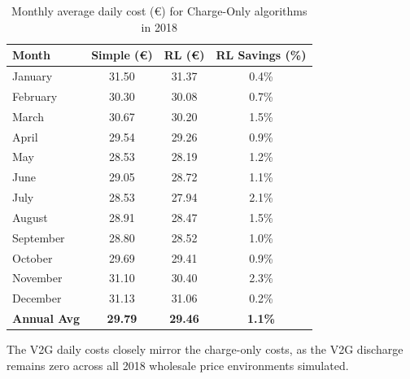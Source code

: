 \begin{table}[H]
\centering
\caption{Monthly average daily cost (€) for Charge-Only algorithms in 2018}
\label{tab:app_monthly_averages}
\begin{tabular}{@{}lccc@{}}
\toprule
\textbf{Month} & \textbf{Simple (€)} & \textbf{RL (€)} & \textbf{RL Savings (\%)} \\
\midrule
January   & 31.50 & 31.37 & 0.4\% \\
February  & 30.30 & 30.08 & 0.7\% \\
March     & 30.67 & 30.20 & 1.5\% \\
April     & 29.54 & 29.26 & 0.9\% \\
May       & 28.53 & 28.19 & 1.2\% \\
June      & 29.05 & 28.72 & 1.1\% \\
July      & 28.53 & 27.94 & 2.1\% \\
August    & 28.91 & 28.47 & 1.5\% \\
September & 28.80 & 28.52 & 1.0\% \\
October   & 29.69 & 29.41 & 0.9\% \\
November  & 31.10 & 30.40 & 2.3\% \\
December  & 31.13 & 31.06 & 0.2\% \\
\midrule
\textbf{Annual Avg} & \textbf{29.79} & \textbf{29.46} & \textbf{1.1\%} \\
\bottomrule
\end{tabular}
\end{table}

The V2G daily costs closely mirror the charge-only costs, as the V2G discharge remains zero across all 2018 wholesale price environments simulated.
